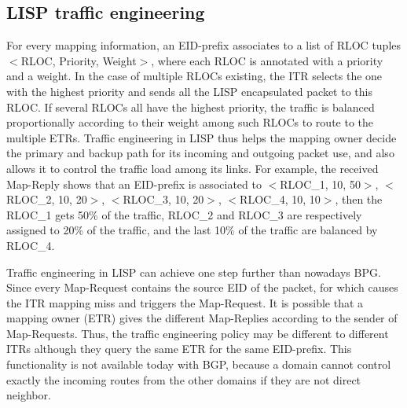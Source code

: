 \subsection{LISP traffic engineering}
\label{subsubsec:te}
For every mapping information, an EID-prefix associates to a list of RLOC tuples $<$RLOC, Priority, Weight$>$, where each RLOC is annotated with a priority and a weight. In the case of multiple RLOCs existing, the ITR selects the one with the highest priority and sends all the LISP encapsulated packet to this RLOC. If several RLOCs all have the highest priority, the traffic is balanced proportionally according to their weight among such RLOCs to route to the multiple ETRs. Traffic engineering in LISP thus helps the mapping owner decide the primary and backup path for its incoming and outgoing packet use, and also allows it to control the traffic load among its links. For example, the received Map-Reply shows that an EID-prefix is associated to $<$RLOC\_1, 10, 50$>$, $<$RLOC\_2, 10, 20$>$, $<$RLOC\_3, 10, 20$>$, $<$RLOC\_4, 10, 10$>$, then the RLOC\_1 gets 50\% of the traffic, RLOC\_2 and RLOC\_3 are respectively assigned to 20\% of the traffic, and the last 10\% of the traffic are balanced by RLOC\_4.  %

Traffic engineering in LISP can achieve one step further than nowadays BPG. Since every Map-Request contains the source EID of the packet, for which causes the ITR mapping miss and triggers the Map-Request. It is possible that a mapping owner (ETR) gives the different Map-Replies according to the sender of Map-Requests. Thus, the traffic engineering policy may be different to different ITRs although they query the same ETR for the same EID-prefix. This functionality is not available today with BGP, because a domain cannot control exactly the incoming routes from the other domains if they are not direct neighbor.


